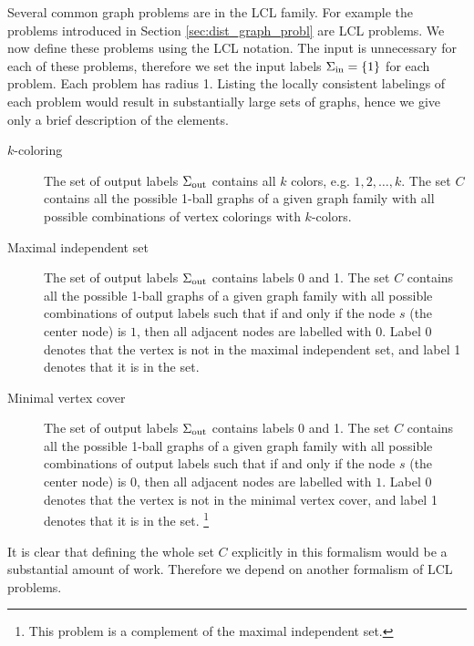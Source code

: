 
Several common graph problems are in the LCL family.
For example the problems introduced in Section \ref{sec:dist_graph_probl} are LCL problems.
We now define these problems using the LCL notation.
The input is unnecessary for each of these problems,
therefore we set the input labels $\Sigma_{\text{in}} = \{1\}$ for each problem.
Each problem has radius 1.
Listing the locally consistent labelings of each problem would result in substantially large sets of graphs, hence we give only a brief description of the elements.
\begin{description}
  \item[$k$-coloring] The set of output labels $\Sigma_{\text{out}}$ contains all $k$ colors, e.g. $1, 2, \dotsc, k$.
  The set $C$ contains all the possible 1-ball graphs of a given graph family with all possible combinations of vertex colorings with $k$-colors.
  \item[Maximal independent set]
  The set of output labels $\Sigma_{\text{out}}$ contains labels 0 and 1.
  The set $C$ contains all the possible 1-ball graphs of a given graph family with all possible combinations of output labels such that if and only if the node $s$ (the center node) is $1$, then all adjacent nodes are labelled with $0$.
  Label 0 denotes that the vertex is not in the maximal independent set, and label 1 denotes that it is in the set.
  \item[Minimal vertex cover]
  The set of output labels $\Sigma_{\text{out}}$ contains labels 0 and 1.
  The set $C$ contains all the possible 1-ball graphs of a given graph family with all possible combinations of output labels such that if and only if the node $s$ (the center node) is $0$, then all adjacent nodes are labelled with $1$.
  Label 0 denotes that the vertex is not in the minimal vertex cover, and label 1 denotes that it is in the set.
  \footnote{This problem is a complement of the maximal independent set.}
\end{description}

It is clear that defining the whole set $C$ explicitly in this formalism would be a substantial amount of work.
Therefore we depend on another formalism of LCL problems.









